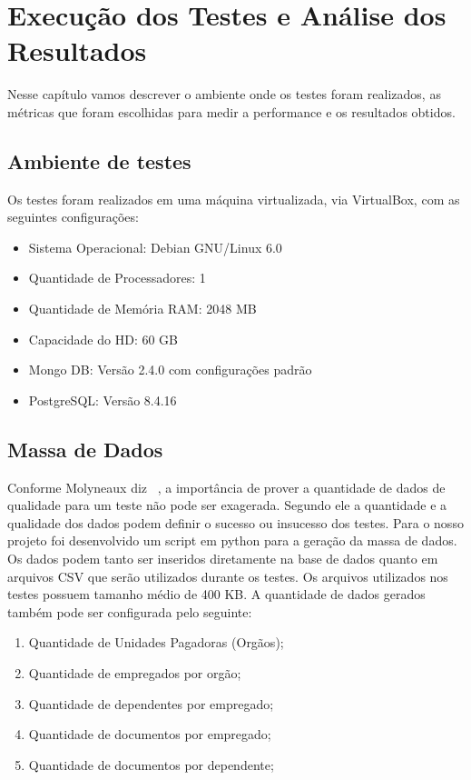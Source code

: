 \chapter {Execução dos Testes e Análise dos Resultados}

Nesse capítulo vamos descrever o ambiente onde os testes foram realizados, as métricas que foram escolhidas para medir a performance e os resultados obtidos.

\section{Ambiente de testes}

Os testes foram realizados em uma máquina virtualizada, via VirtualBox, com as seguintes configurações:

\begin{itemize}
\item Sistema Operacional: Debian GNU/Linux 6.0
\item Quantidade de Processadores: 1 
\item Quantidade de Memória RAM: 2048 MB
\item Capacidade do HD: 60 GB
\item Mongo DB: Versão 2.4.0 com configurações padrão
\item PostgreSQL: Versão 8.4.16
\end{itemize}

\section{Massa de Dados}

Conforme Molyneaux diz ~\cite{theartoftestperf}, a importância de prover a quantidade de dados de qualidade para um teste não pode ser exagerada. Segundo ele a quantidade e a qualidade dos dados podem definir o sucesso ou insucesso dos testes. Para o nosso projeto foi desenvolvido um script em python para a geração da massa de dados. Os dados podem tanto ser inseridos diretamente na base de dados quanto em arquivos CSV que serão utilizados durante os testes. Os arquivos utilizados nos testes possuem tamanho médio de 400 KB. A quantidade de dados gerados também pode ser configurada pelo seguinte:

\begin{enumerate}
	\item Quantidade de Unidades Pagadoras (Orgãos);
	\item Quantidade de empregados por orgão;
	\item Quantidade de dependentes por empregado;
	\item Quantidade de documentos por empregado;
	\item Quantidade de documentos por dependente;
\end{enumerate}

